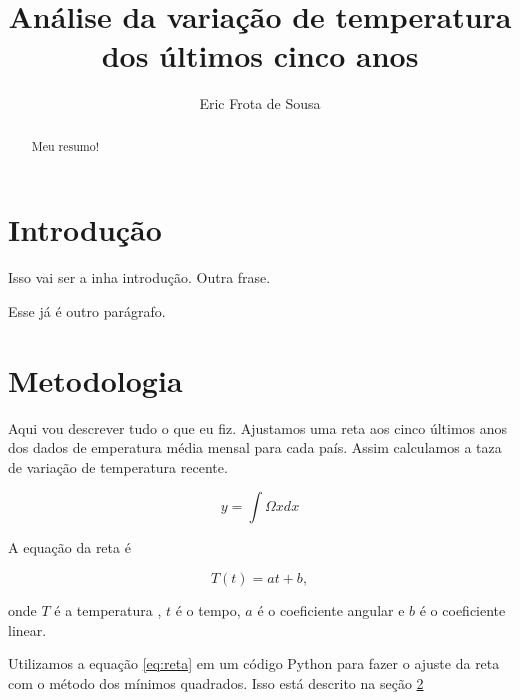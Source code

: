 \documentclass{article}
\begin{document}
\title{Análise da variação de temperatura dos últimos cinco anos}
\author{Eric Frota de Sousa}

\maketitle

\begin{abstract}
Meu resumo!
\end{abstract}

\section{Introdução}
Isso vai ser a inha introdução.
Outra frase.

Esse já é outro parágrafo.

\section{Metodologia}
\label{sec:metodos}

Aqui vou descrever tudo o que eu fiz.
Ajustamos uma reta aos cinco últimos anos dos dados
de emperatura média mensal para cada país.
Assim calculamos a taza de variação de temperatura recente.



\begin{equation}
y = \int\Omega x dx
\end{equation}

A equação da reta é

\begin{equation}
T(t) = a t + b,
\label{eq:reta}
\end{equation}

\noindent
onde $T$ é a temperatura , $t$ é o tempo, $a$ é o coeficiente angular
e $b$ é o coeficiente linear.

Utilizamos a equação \ref{eq:reta} em um código Python para fazer o ajuste da
reta com o método dos mínimos quadrados.
Isso está descrito na seção \ref{sec:metodos}

\end{document}
